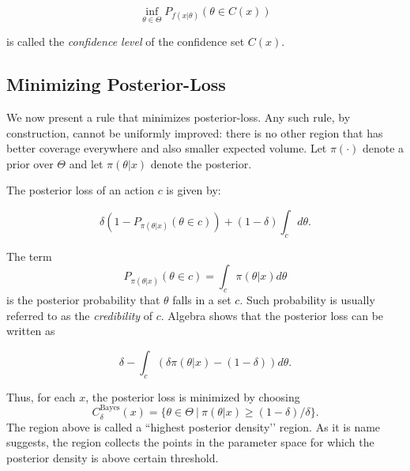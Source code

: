 \documentclass[11pt]{article} %
\begin{document}
\[ \inf_{\theta \in \Theta} P_{f(x|\theta)} ( \theta \in C(x) )  \]  

\noindent is called the \emph{confidence level} of the confidence set $C(x)$. 

\subsection{Minimizing Posterior-Loss}

We now present a rule that minimizes posterior-loss. Any such rule, by construction, cannot be uniformly improved: there is no other region that has better coverage everywhere and also smaller expected volume. Let $\pi(\cdot)$ denote a prior over $\Theta$ and let $\pi(\theta | x)$ denote the posterior. 

The posterior loss of an action $c$ is given by:

\[ \delta(1- P_{\pi(\theta | x)}( \theta \in c  )) + (1-\delta) \int_{c} d \theta.   \]

\noindent The term 
\[ P_{\pi(\theta | x)}( \theta \in c ) = \int_{c} \pi(\theta | x) d \theta  \] 
\noindent is the posterior probability that $\theta$ falls in a set $c$. Such probability is usually referred to as the \emph{credibility} of $c$. Algebra shows that the posterior loss can be written as

\[ \delta - \int_{c}  \left(  \delta \pi(\theta | x) - (1-\delta) \right) d\theta.  \]

\noindent Thus, for each $x$, the posterior loss is minimized by choosing
\begin{equation} \label{equation:HPD}
C^{\textrm{Bayes}}_{\delta}(x) = \{ \theta \in \Theta \: | \: \pi(\theta | x) \geq (1-\delta)/\delta  \}.
\end{equation}
The region above is called a ``highest posterior density’’ region. As it is name suggests, the region collects the points in the parameter space for which the posterior density is above certain threshold. 
\end{document}
